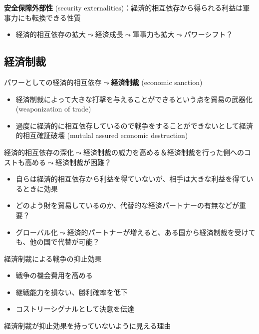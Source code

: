 \documentclass[
  xelatex,
  ja=standard]{bxjsarticle}
\providecommand{\tightlist}{%
  \setlength{\itemsep}{0pt}\setlength{\parskip}{0pt}}\usepackage{longtable,booktabs,array}
\begin{document}
\textbf{安全保障外部性} (security
externalities)：経済的相互依存から得られる利益は軍事力にも転換できる性質\citep{gowa1993}

\begin{itemize}
\tightlist
\item
  経済的相互依存の拡大\(\leadsto\)経済成長\(\leadsto\)軍事力も拡大\(\leadsto\)パワーシフト？
\end{itemize}

\hypertarget{ux7d4cux6e08ux5236ux88c1}{%
\subsection{経済制裁}\label{ux7d4cux6e08ux5236ux88c1}}

パワーとしての経済的相互依存\(\leadsto\)\textbf{経済制裁} (economic
sanction)

\begin{itemize}
\tightlist
\item
  経済制裁によって大きな打撃を与えることができるという点を貿易の武器化
  (weaponization of trade)
\item
  過度に経済的に相互依存しているので戦争をすることができないとして経済的相互確証破壊
  (mutulal assured economic destruction)
\end{itemize}

経済的相互依存の深化\(\leadsto\)経済制裁の威力を高める＆経済制裁を行った側へのコストも高める\(\leadsto\)経済制裁が困難？

\begin{itemize}
\tightlist
\item
  自らは経済的相互依存から利益を得ていないが、相手は大きな利益を得ているときに効果
\item
  どのよう財を貿易しているのか、代替的な経済パートナーの有無などが重要？
\item
  グローバル化\(\leadsto\)経済的パートナーが増えると、ある国から経済制裁を受けても、他の国で代替が可能？
\end{itemize}

経済制裁による戦争の抑止効果

\begin{itemize}
\tightlist
\item
  戦争の機会費用を高める
\item
  継戦能力を損ない、勝利確率を低下
\item
  コストリーシグナルとして決意を伝達\citep{lektzian2007}
\end{itemize}

経済制裁が抑止効果を持っていないように見える理由
\end{document}
